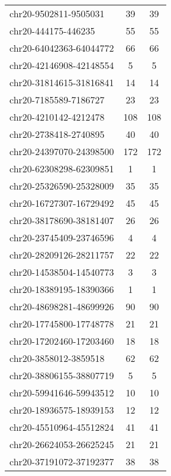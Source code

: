 \begin{longtable}{lSS}
	chr20-9502811-9505031   & 39     & 39                                        \\
	chr20-444175-446235     & 55     & 55                                        \\
	chr20-64042363-64044772 & 66     & 66                                        \\
	chr20-42146908-42148554 & 5      & 5                                         \\
	chr20-31814615-31816841 & 14     & 14                                        \\
	chr20-7185589-7186727   & 23     & 23                                        \\
	chr20-4210142-4212478   & 108    & 108                                       \\
	chr20-2738418-2740895   & 40     & 40                                        \\
	chr20-24397070-24398500 & 172    & 172                                       \\
	chr20-62308298-62309851 & 1      & 1                                         \\
	chr20-25326590-25328009 & 35     & 35                                        \\
	chr20-16727307-16729492 & 45     & 45                                        \\
	chr20-38178690-38181407 & 26     & 26                                        \\
	chr20-23745409-23746596 & 4      & 4                                         \\
	chr20-28209126-28211757 & 22     & 22                                        \\
	chr20-14538504-14540773 & 3      & 3                                         \\
	chr20-18389195-18390366 & 1      & 1                                         \\
	chr20-48698281-48699926 & 90     & 90                                        \\
	chr20-17745800-17748778 & 21     & 21                                        \\
	chr20-17202460-17203460 & 18     & 18                                        \\
	chr20-3858012-3859518   & 62     & 62                                        \\
	chr20-38806155-38807719 & 5      & 5                                         \\
	chr20-59941646-59943512 & 10     & 10                                        \\
	chr20-18936575-18939153 & 12     & 12                                        \\
	chr20-45510964-45512824 & 41     & 41                                        \\
	chr20-26624053-26625245 & 21     & 21                                        \\
	chr20-37191072-37192377 & 38     & 38                                        \\
\end{longtable}
